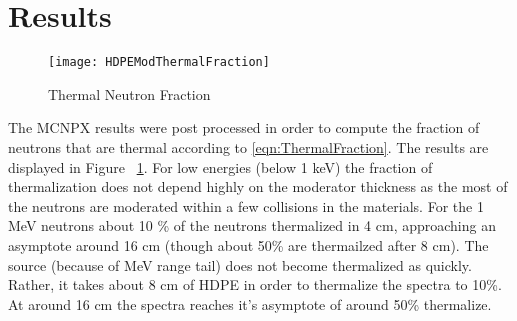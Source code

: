 \section{Results}
\begin{figure}[!ht]
	\centering
	\texttt{[image: HDPEModThermalFraction]}
	  \caption{Thermal Neutron Fraction}
	  \label{fig:ThermalNeutronFraction}
\end{figure}
The MCNPX results were post processed in order to compute the fraction of neutrons that are thermal according to \eqref{eqn:ThermalFraction}.
The results are displayed in  Figure ~\ref{fig:ThermalNeutronFraction}.
For low energies (below 1 keV) the fraction of thermalization does not depend highly on the moderator thickness as the most of the neutrons are moderated within a few collisions in the materials.
For the 1 MeV neutrons about 10 \% of the neutrons thermalized in 4 cm, approaching an asymptote around 16 cm (though about 50\% are thermailzed after 8 cm).
The  source (because of MeV range tail) does not become thermalized as quickly.
Rather, it takes about 8 cm of HDPE in order to thermalize the spectra to 10\%. 
At around 16 cm the  spectra reaches it's asymptote of around 50\% thermalize.
